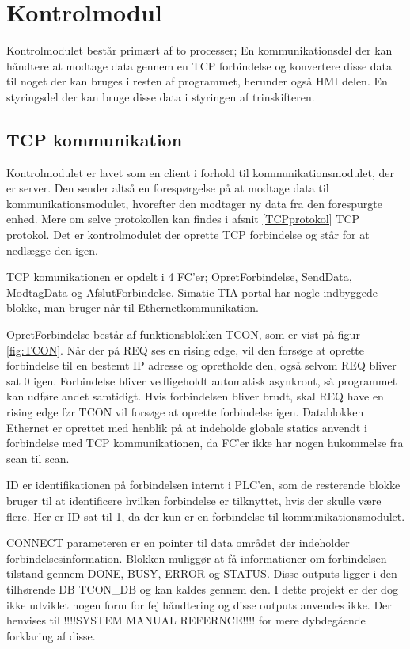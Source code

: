 
\section{Kontrolmodul}
Kontrolmodulet består primært af to processer; En kommunikationsdel der kan håndtere at modtage data gennem en TCP forbindelse og konvertere disse data til noget der kan bruges i resten af programmet, herunder også HMI delen. En styringsdel der kan bruge disse data i styringen af trinskifteren.


\subsection{TCP kommunikation}
Kontrolmodulet er lavet som en client i forhold til kommunikationsmodulet, der er server. Den sender altså en forespørgelse på at modtage data til kommunikationsmodulet, hvorefter den modtager ny data fra den forespurgte enhed. Mere om selve protokollen kan findes i afsnit \ref{TCPprotokol} TCP protokol. Det er kontrolmodulet der oprette TCP forbindelse og står for at nedlægge den igen.

TCP komunikationen er opdelt i 4 FC'er; OpretForbindelse, SendData, ModtagData og AfslutForbindelse. Simatic TIA portal har nogle indbyggede blokke, man bruger når til Ethernetkommunikation.

OpretForbindelse består af funktionsblokken TCON, som er vist på figur \ref{fig:TCON}. Når der på REQ ses en rising edge, vil den forsøge at oprette forbindelse til en bestemt IP adresse og opretholde den, også selvom REQ bliver sat 0 igen. Forbindelse bliver vedligeholdt automatisk asynkront, så programmet kan udføre andet samtidigt. Hvis forbindelsen bliver brudt, skal REQ have en rising edge før TCON vil forsøge at oprette forbindelse igen. Datablokken Ethernet er oprettet med henblik på at indeholde globale statics anvendt i forbindelse med TCP kommunikationen, da FC'er ikke har nogen hukommelse fra scan til scan.

ID er identifikationen på forbindelsen internt i PLC'en, som de resterende blokke bruger til at identificere hvilken forbindelse er tilknyttet, hvis der skulle være flere. Her er ID sat til 1, da der kun er en forbindelse til kommunikationsmodulet.

CONNECT parameteren er en pointer til data området der indeholder forbindelsesinformation. Blokken muliggør at få informationer om forbindelsen tilstand gennem DONE, BUSY, ERROR og STATUS. Disse outputs ligger i den tilhørende DB TCON\_DB og kan kaldes gennem den. I dette projekt er der dog ikke udviklet nogen form for fejlhåndtering og disse outputs anvendes ikke. Der henvises til !!!!SYSTEM MANUAL REFERNCE!!!! for mere dybdegående forklaring af disse.

